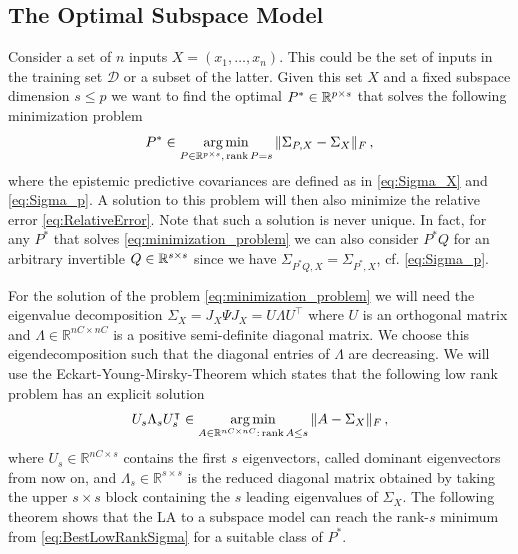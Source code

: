 \subsection{The Optimal Subspace Model}
Consider a set of $n$ inputs $X=\left(x_1, \ldots, x_n \right)$. This could be the set of inputs in the training set $\mathcal{D}$ or a subset of the latter.  Given this set $X$ and a fixed subspace dimension $s\leq p$ we want to find the optimal $P^*\in \mathbb{R}^{p\times s}$ that solves the following minimization problem
\begin{align}
    \label{eq:minimization_problem}
    P^* \in \operatorname*{arg\,min}_{P\in \mathbb{R}^{p\times s}, \,\mathrm{rank} \,P=s} \|\Sigma_{P,X} - \Sigma_X\|_F \,,
\end{align}
where the epistemic predictive covariances are defined as in \eqref{eq:Sigma_X} and \eqref{eq:Sigma_p}.
A solution to this problem will then also minimize the relative error \eqref{eq:RelativeError}. Note that such a solution is never unique. In fact, for any $P^*$ that solves \eqref{eq:minimization_problem} we can also consider $P^*Q$ for an arbitrary invertible $Q\in \mathbb{R}^{s\times s}$ since we have $\Sigma_{P^*Q,X}=\Sigma_{P^*,X}$, cf. \eqref{eq:Sigma_p}.

For the solution of the problem \eqref{eq:minimization_problem} we will need the eigenvalue decomposition $\Sigma_X = J_X \Psi J_X = U \Lambda U^\intercal$ where $U$ is an orthogonal matrix and $\Lambda \in \mathbb{R}^{nC \times nC}$ is a positive semi-definite diagonal matrix. We choose this eigendecomposition such that the diagonal entries of $\Lambda$ are decreasing. We will use the Eckart-Young-Mirsky-Theorem \cite{Schmidt1907,Eckart1936,Mirsky1960} which states that the following low rank problem has an explicit solution
\begin{align}
    \label{eq:BestLowRankSigma}
    U_s \Lambda_s U_s^\intercal \in \operatorname*{arg\,min}_{A\in \mathbb{R}^{nC \times nC}: \,\mathrm{rank}\,A \leq s} \| A- \Sigma_X \|_F \,,
\end{align}
where $U_s \in \mathbb{R}^{nC \times s}$ contains the first $s$ eigenvectors, called dominant eigenvectors from now on, and $\Lambda_s \in \mathbb{R}^{s\times s}$ is the reduced diagonal matrix obtained by taking the upper $s \times s$ block containing the $s$ leading eigenvalues of $\Sigma_X$.
The following theorem shows that the LA to a subspace model can reach the rank-$s$ minimum from \eqref{eq:BestLowRankSigma} for a suitable class of $P^*$. 


